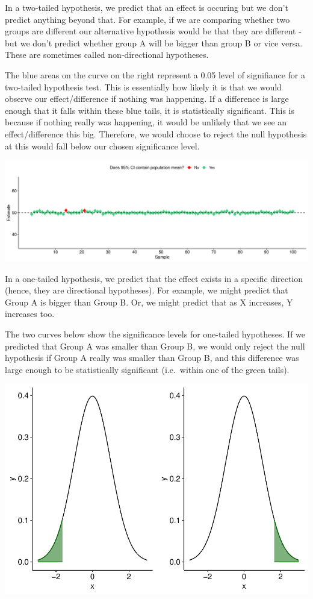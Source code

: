 \documentclass[
]{book}
\begin{document}
In a two-tailed hypothesis, we predict that an effect is occuring but we don't predict anything beyond that. For example, if we are comparing whether two groups are different our alternative hypothesis would be that they are different - but we don't predict whether group A will be bigger than group B or vice versa. These are sometimes called non-directional hypotheses.

The blue areas on the curve on the right represent a 0.05 level of signifiance for a two-tailed hypothesis test. This is essentially how likely it is that we would observe our effect/difference if nothing was happening. If a difference is large enough that it falls within these blue tails, it is statistically significant. This is because if nothing really was happening, it would be unlikely that we see an effect/difference this big. Therefore, we would choose to reject the null hypothesis at this would fall below our chosen significance level.

\includegraphics{_main_files/figure-latex/unnamed-chunk-90-1.pdf}

In a one-tailed hypothesis, we predict that the effect exists in a specific direction (hence, they are directional hypotheses). For example, we might predict that Group A is bigger than Group B. Or, we might predict that as X increases, Y increases too.

The two curves below show the significance levels for one-tailed hypotheses. If we predicted that Group A was smaller than Group B, we would only reject the null hypothesis if Group A really was smaller than Group B, and this difference was large enough to be statistically significant (i.e.~within one of the green tails).

\includegraphics{_main_files/figure-latex/unnamed-chunk-91-1.pdf}
\end{document}

